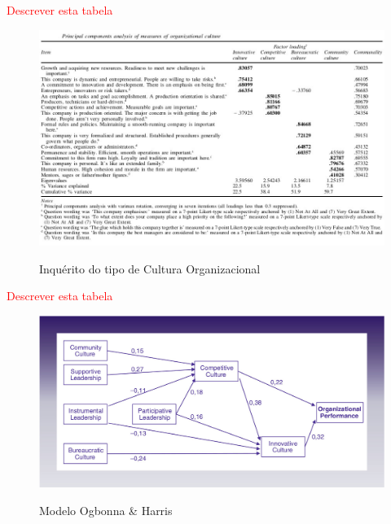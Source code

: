 \textcolor{red}{Descrever esta tabela}\\
\vspace{1cm}
\begin{figure}[H]
\centering
\includegraphics[scale=.6]{"./image/OB/Culture.jpg"}\\
\caption{Inquérito do tipo de Cultura Organizacional \cite{article_1}}
\end{figure}\par
\textcolor{red}{Descrever esta tabela}\\
\begin{figure}[H]
\centering
\includegraphics[scale=.35]{"./image/OB/Ogbonna & Harris.jpg"}\\
\caption{Modelo Ogbonna \& Harris \cite{article_1}}
\label{Modelo}
\end{figure}\par
